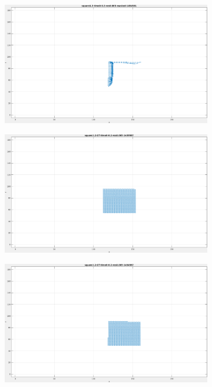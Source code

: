 \begin{appendix}
\begin{figure}[tb]
\begin{subfigure}{.45\textwidth}
  \caption{}
\end{subfigure}
\begin{subfigure}{.45\textwidth}
  \centering
  \includegraphics[height=.6\linewidth]{figs/square12/square12-masked-2.png}
  \caption{}
\end{subfigure}
\begin{subfigure}{.45\textwidth}
  \centering
  \includegraphics[height=.6\linewidth]{figs/square12/square12-GT-1.png}
  \caption{}
\end{subfigure}
\begin{subfigure}{.45\textwidth}
  \centering
  \includegraphics[height=.6\linewidth]{figs/square12/square12-GT-2.png}

\end{subfigure}
\end{figure}
\end{appendix}
